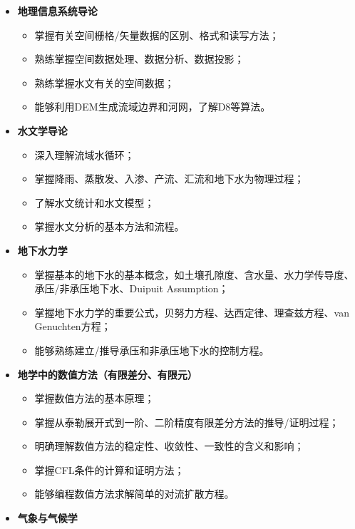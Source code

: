 \documentclass[
]{book}
\providecommand{\tightlist}{%
  \setlength{\itemsep}{0pt}\setlength{\parskip}{0pt}}
\begin{document}
\begin{itemize}
\tightlist
\item
  \textbf{地理信息系统导论}

  \begin{itemize}
  \tightlist
  \item
    掌握有关空间栅格/矢量数据的区别、格式和读写方法；
  \item
    熟练掌握空间数据处理、数据分析、数据投影；
  \item
    熟练掌握水文有关的空间数据；
  \item
    能够利用DEM生成流域边界和河网，了解D8等算法。
  \end{itemize}
\item
  \textbf{水文学导论}

  \begin{itemize}
  \tightlist
  \item
    深入理解流域水循环；
  \item
    掌握降雨、蒸散发、入渗、产流、汇流和地下水为物理过程；
  \item
    了解水文统计和水文模型；
  \item
    掌握水文分析的基本方法和流程。
  \end{itemize}
\item
  \textbf{地下水力学}

  \begin{itemize}
  \tightlist
  \item
    掌握基本的地下水的基本概念，如土壤孔隙度、含水量、水力学传导度、承压/非承压地下水、Duipuit Assumption；
  \item
    掌握地下水力学的重要公式，贝努力方程、达西定律、理查兹方程、van Genuchten方程；
  \item
    能够熟练建立/推导承压和非承压地下水的控制方程。
  \end{itemize}
\item
  \textbf{地学中的数值方法（有限差分、有限元）}

  \begin{itemize}
  \tightlist
  \item
    掌握数值方法的基本原理；
  \item
    掌握从泰勒展开式到一阶、二阶精度有限差分方法的推导/证明过程；
  \item
    明确理解数值方法的稳定性、收敛性、一致性的含义和影响；
  \item
    掌握CFL条件的计算和证明方法；
  \item
    能够编程数值方法求解简单的对流扩散方程。
  \end{itemize}
\item
  \textbf{气象与气候学}


\end{itemize}
\end{document}
